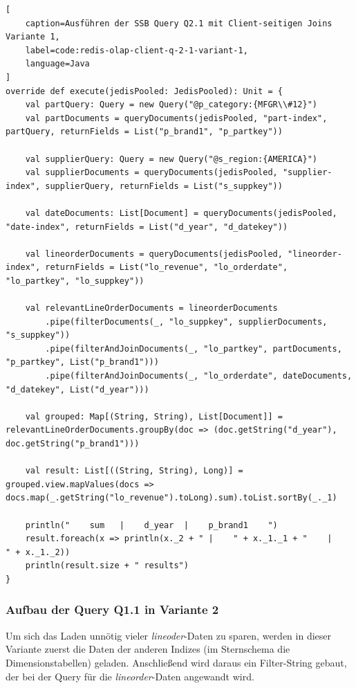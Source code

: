 \begin{lstlisting}[
    caption=Ausführen der SSB Query Q2.1 mit Client-seitigen Joins Variante 1,
    label=code:redis-olap-client-q-2-1-variant-1,
    language=Java
]
override def execute(jedisPooled: JedisPooled): Unit = {
	val partQuery: Query = new Query("@p_category:{MFGR\\#12}")
	val partDocuments = queryDocuments(jedisPooled, "part-index", partQuery, returnFields = List("p_brand1", "p_partkey"))

	val supplierQuery: Query = new Query("@s_region:{AMERICA}")
	val supplierDocuments = queryDocuments(jedisPooled, "supplier-index", supplierQuery, returnFields = List("s_suppkey"))

	val dateDocuments: List[Document] = queryDocuments(jedisPooled, "date-index", returnFields = List("d_year", "d_datekey"))

	val lineorderDocuments = queryDocuments(jedisPooled, "lineorder-index", returnFields = List("lo_revenue", "lo_orderdate", "lo_partkey", "lo_suppkey"))

	val relevantLineOrderDocuments = lineorderDocuments
		.pipe(filterDocuments(_, "lo_suppkey", supplierDocuments, "s_suppkey"))
		.pipe(filterAndJoinDocuments(_, "lo_partkey", partDocuments, "p_partkey", List("p_brand1")))
		.pipe(filterAndJoinDocuments(_, "lo_orderdate", dateDocuments, "d_datekey", List("d_year")))

	val grouped: Map[(String, String), List[Document]] = relevantLineOrderDocuments.groupBy(doc => (doc.getString("d_year"), doc.getString("p_brand1")))

	val result: List[((String, String), Long)] = grouped.view.mapValues(docs => docs.map(_.getString("lo_revenue").toLong).sum).toList.sortBy(_._1)

	println("    sum   |    d_year  |    p_brand1    ")
	result.foreach(x => println(x._2 + " |    " + x._1._1 + "    |    " + x._1._2))
	println(result.size + " results")
}
\end{lstlisting}


\subsubsection{Aufbau der Query Q1.1 in Variante 2}
Um sich das Laden unnötig vieler \emph{lineoder}-Daten zu sparen, werden in dieser Variante zuerst die Daten der anderen Indizes (im Sternschema die Dimensionstabellen) geladen. Anschließend wird daraus ein Filter-String gebaut, der bei der Query für die \emph{lineorder}-Daten angewandt wird.

